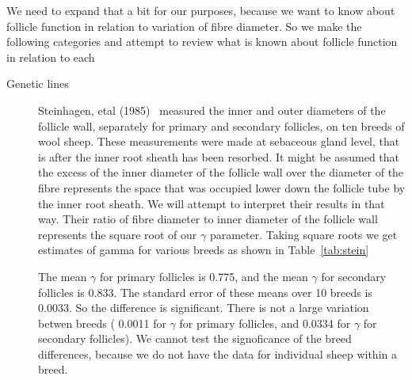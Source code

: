 \documentclass[titlepage]{article}  %
\begin{document}
We need to expand that a bit for our purposes, because we want to know about follicle function in relation to variation of fibre diameter. So we make the following categories and attempt to review what is known about follicle function in relation to each
\begin{description}
\item[Genetic lines] Steinhagen, etal (1985)~\cite{stei:85} measured the inner and outer diameters of the follicle wall, separately for primary and secondary follicles, on ten breeds of wool sheep.  These measurements were made at sebaceous gland level, that is after the inner root sheath has been resorbed. It might be assumed that the excess of the inner diameter of the follicle wall over the diameter of the fibre represents the space that was occupied lower down the follicle tube by the inner root sheath. We will attempt to interpret their results in that way. Their ratio of fibre diameter to inner diameter of the follicle wall represents the square root of our $\gamma$ parameter. Taking square roots we get estimates of gamma for various breeds as shown in Table~\ref{tab:stein}

The mean $\gamma$ for primary follicles is 0.775, and the mean  $\gamma$  for secondary follicles is 0.833. The standard error of these means over 10 breeds is 0.0033. So the difference is significant. There is not  a large variation betwen breeds ( 0.0011 for $\gamma$ for primary follicles, and 0.0334 for $\gamma$  for secondary follicles).  We cannot test the signoficance of the breed differences, because we do not have the data for individual sheep within a breed.


\end{description}
\end{document}
